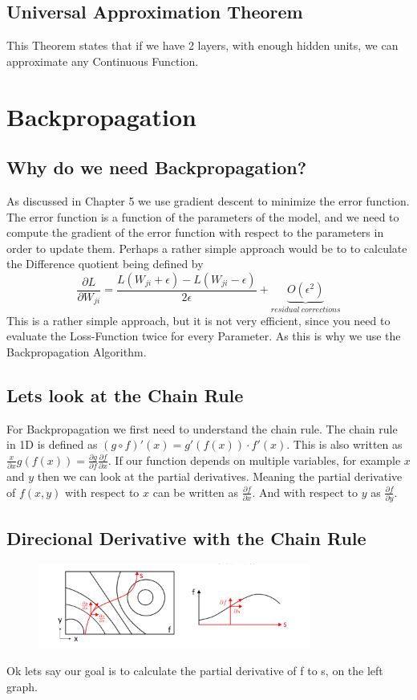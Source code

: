 \documentclass[a4paper]{article}
\begin{document}
\subsection{Universal Approximation Theorem}
This Theorem  states that if we have 2 layers, with enough hidden units, 
we can approximate any Continuous Function.

\section{Backpropagation}
\subsection{Why do we need Backpropagation?}
 As discussed in Chapter 5 we use gradient descent to minimize the error function. The error function is a function of the parameters of the model, and we need to compute the gradient of the error function with respect to the parameters in order to update them. 
 Perhaps a rather simple approach would be to to calculate the Difference quotient being defined by $$\frac{\partial L}{\partial W_{ji}} = \frac{L(W_{ji} + \epsilon) - L(W_{ji} - \epsilon)}{2 \epsilon} + \underbrace{O(\epsilon^{2})}_{residual \ corrections}$$ This is a rather simple approach, but it is not very efficient, since you need to evaluate the Loss-Function twice for every Parameter. As this is why we use the Backpropagation Algorithm.

 \subsection{Lets look at the Chain Rule}
 For Backpropagation we first need to understand the chain rule. The chain rule in 1D is defined as $(g \circ f)' (x) = g' (f(x)) \cdot f'(x)$. This is also written as $\frac{x}{\partial x} g(f(x)) = \frac{\partial g}{\partial f} \frac{\partial f}{\partial x}$.
 If our function depends on multiple variables, for example $x$ and $y$ then we can look at the partial derivatives. Meaning the partial derivative of $f(x,y) $ with respect to $x$ can be written as $\frac{\partial f}{\partial x}$. And with respect to $y$ as $\frac{\partial f}{\partial y}$. 

 \newpage
 \subsection{Direcional Derivative with the Chain Rule}
 \begin{figure}[h]
    \centering
    \includegraphics[width=0.8\textwidth]{images/richtungsableitung.png}
    \caption{}
    \label{fig:Richtungsableitung}
\end{figure}
Ok lets say our goal is to calculate the partial derivative of f to s, on the left graph.  
 
\end{document}
